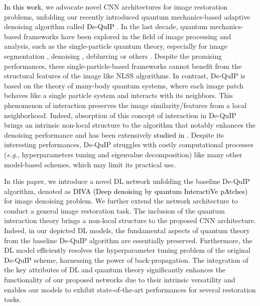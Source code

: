 \documentclass[10pt,journal,compsoc]{IEEEtran}
\newcommand{\sd}{\textcolor{black}}
\newcommand{\dk}{\textcolor{black}}
\begin{document}


\dk{In this work}, we advocate novel CNN architectures for image restoration problems, unfolding our recently introduced quantum mechanics-based adaptive denoising algorithm called
\sd{De-QuIP} \cite{dutta2021image, dutta2022novel}. In the last decade, quantum mechanics-based frameworks have been explored in the field of image processing and analysis, such as the single-particle quantum theory, especially for image segmentation \cite{aytekin2013quantum, youssry2015quantum}, denoising \cite{kaisserli2015novel, dutta2021quantum}, deblurring \cite{dutta2021plug, dutta2021poisson} or others \cite{Altmann2018quantum}. Despite the promising performances, these single-particle-based frameworks cannot benefit from the structural features of the image like NLSS algorithms. In contrast, De-QuIP is based on the theory of many-body quantum systems, where each image patch behaves like a single particle system and interacts with its neighbors. This phenomenon of interaction preserves the image similarity/features from a local neighborhood. Indeed, absorption of this concept of interaction in De-QuIP brings an intrinsic non-local structure to the algorithm that notably enhances the denoising performance and has been extensively \sd{studied in \cite{dutta2022novel}.}
Despite its interesting performances, De-QuIP struggles with costly computational processes (\textit{e.g.}, hyperparameters tuning and eigenvalue decomposition) like many other model-based schemes, which may limit its practical use.



In this paper, we introduce a novel DL network unfolding the baseline De-QuIP algorithm, denoted as \dk{DIVA (Deep denoising by quantum InteractiVe pAtches)} for image denoising problem. We further extend the network architecture to conduct a general image restoration task. The inclusion of the quantum interaction theory brings a non-local structure to the proposed CNN architecture. Indeed, in our depicted DL models, the fundamental aspects of quantum theory from the baseline De-QuIP algorithm are essentially preserved. Furthermore, the DL model efficiently resolves the hyperparameter tuning problem of the original De-QuIP scheme, harnessing the power of back-propagation. The integration of the key attributes of DL and quantum theory significantly enhances the functionality of our proposed networks due to their intrinsic versatility and enables our models to exhibit state-of-the-art performances for several restoration tasks.
\end{document}
